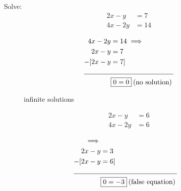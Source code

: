 \documentclass[a4paper,11pt,twoside]{report}
\begin{document}
\begin{example}
	Solve:
\begin{align*}
	2x - y &= 7 \\
4x - 2y &= 14
\end{align*}

\end{example}

\begin{solution}[]
	\begin{align*}
		4x - 2y &= 14 \implies \\
	2x - y &= 7 \\
	-[2x - y &= 7] \\
	\cline{1-2}
			 &\boxed{0=0}\:\text{(no solution)}\:
	\end{align*}
\end{solution}
\begin{figure}[ht]
    \centering
    \caption{infinite solutions}
    \label{fig:infinite-solutions}
\end{figure}

\begin{example}[No solutions]
	\begin{align*}
		2x - y &= 6 \\
		4x - 2y &= 6
	\end{align*}
\end{example}

\begin{solution}[]
	\begin{align*}
		[4x - 2y &= 6] \implies \\
		2x - y &= 3 \\
		-[2x - y &= 6] \\
		\cline{1-2}
				 &\boxed{0=-3}\:\text{(false equation)}\:
	\end{align*}
\end{solution}



\newpage
\end{document}
